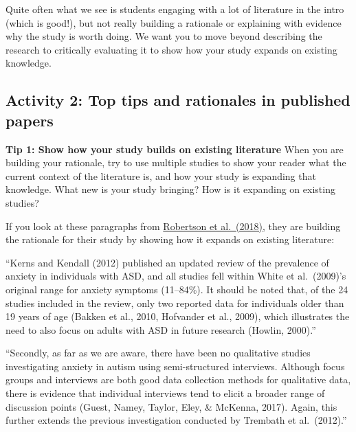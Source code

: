 \documentclass[
  english,
  letterpaper,
  DIV=11,
  numbers=noendperiod]{scrreprt}
\begin{document}
Quite often what we see is students engaging with a lot of literature in
the intro (which is good!), but not really building a rationale or
explaining with evidence why the study is worth doing. We want you to
move beyond describing the research to critically evaluating it to show
how your study expands on existing knowledge.

\subsection{Activity 2: Top tips and rationales in published
papers}\label{activity-2-top-tips-and-rationales-in-published-papers}

\textbf{Tip 1: Show how your study builds on existing literature} When
you are building your rationale, try to use multiple studies to show
your reader what the current context of the literature is, and how your
study is expanding that knowledge. What new is your study bringing? How
is it expanding on existing studies?

If you look at these paragraphs from
\href{https://www.sciencedirect.com/science/article/pii/S1750946717301277}{Robertson
et al.~(2018)}, they are building the rationale for their study by
showing how it expands on existing literature:

\begin{tcolorbox}[enhanced jigsaw, breakable, bottomtitle=1mm, leftrule=.75mm, opacityback=0, colbacktitle=quarto-callout-note-color!10!white, opacitybacktitle=0.6, toprule=.15mm, colback=white, left=2mm, coltitle=black, bottomrule=.15mm, titlerule=0mm, title={Building a rationale}, toptitle=1mm, colframe=quarto-callout-note-color-frame, arc=.35mm, rightrule=.15mm]

``Kerns and Kendall (2012) published an updated review of the prevalence
of anxiety in individuals with ASD, and all studies fell within White et
al.~(2009)'s original range for anxiety symptoms (11--84\%). It should
be noted that, of the 24 studies included in the review, only two
reported data for individuals older than 19 years of age (Bakken et al.,
2010, Hofvander et al., 2009), which illustrates the need to also focus
on adults with ASD in future research (Howlin, 2000).''

``Secondly, as far as we are aware, there have been no qualitative
studies investigating anxiety in autism using semi-structured
interviews. Although focus groups and interviews are both good data
collection methods for qualitative data, there is evidence that
individual interviews tend to elicit a broader range of discussion
points (Guest, Namey, Taylor, Eley, \& McKenna, 2017). Again, this
further extends the previous investigation conducted by Trembath et
al.~(2012).''

\end{tcolorbox}
\end{document}
